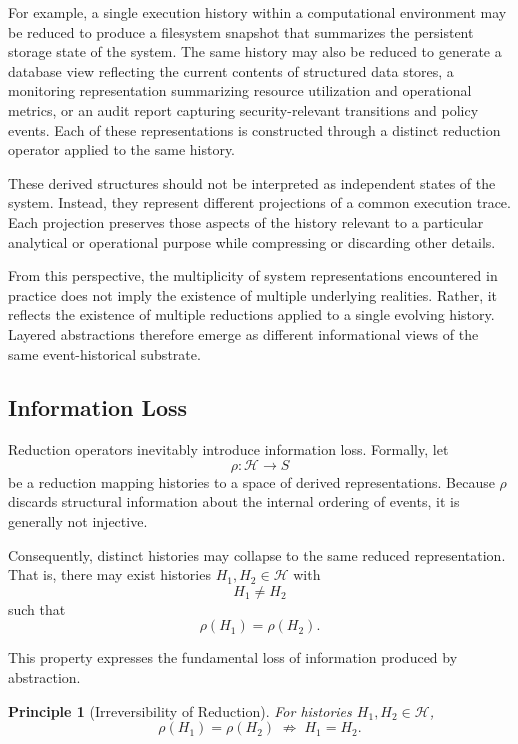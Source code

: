 \documentclass[12pt]{article}
\newtheorem{principle}{Principle}
\begin{document}
For example, a single execution history within a computational
environment may be reduced to produce a filesystem snapshot
that summarizes the persistent storage state of the system.
The same history may also be reduced to generate a database
view reflecting the current contents of structured data
stores, a monitoring representation summarizing resource
utilization and operational metrics, or an audit report
capturing security-relevant transitions and policy events.
Each of these representations is constructed through a
distinct reduction operator applied to the same history.

These derived structures should not be interpreted as
independent states of the system. Instead, they represent
different projections of a common execution trace. Each
projection preserves those aspects of the history relevant
to a particular analytical or operational purpose while
compressing or discarding other details.

From this perspective, the multiplicity of system
representations encountered in practice does not imply
the existence of multiple underlying realities. Rather,
it reflects the existence of multiple reductions applied
to a single evolving history. Layered abstractions therefore
emerge as different informational views of the same
event-historical substrate.

\subsection{Information Loss}

Reduction operators inevitably introduce information loss.
Formally, let
\[
\rho : \mathcal{H} \rightarrow S
\]
be a reduction mapping histories to a space of derived
representations. Because $\rho$ discards structural
information about the internal ordering of events,
it is generally not injective.

Consequently, distinct histories may collapse to the
same reduced representation. That is, there may exist
histories $H_1, H_2 \in \mathcal{H}$ with
\[
H_1 \neq H_2
\]
such that
\[
\rho(H_1) = \rho(H_2).
\]

This property expresses the fundamental loss of
information produced by abstraction.

\begin{principle}[Irreversibility of Reduction]
For histories $H_1, H_2 \in \mathcal{H}$,
\[
\rho(H_1) = \rho(H_2) \;\not\Rightarrow\; H_1 = H_2.
\]
\end{principle}
\end{document}
